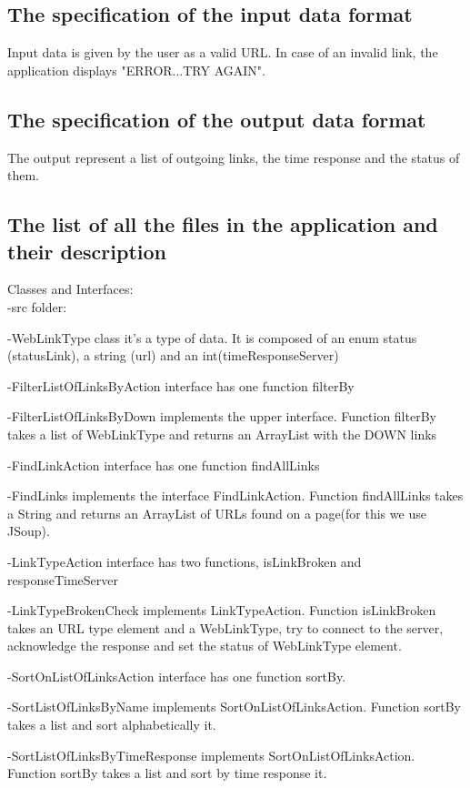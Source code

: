 \documentclass[11pt,leqno]{article}
\begin{document}
\subsection{The specification of the input data format}
Input data is given by the user as a valid URL. In case of an invalid link, the application displays "ERROR...TRY AGAIN".
\vspace{5mm}
\subsection{The specification of the output data format}
The output represent a list of outgoing links, the time response and the status of them.
\vspace{5mm}
\newpage
\subsection{The list of all the files in the application and their description}
Classes and Interfaces:\\
-src folder:\par
-WebLinkType class it's a type of data. It is composed of an enum status (statusLink), a string (url) and an int(timeResponseServer)\par
-FilterListOfLinksByAction interface has one function filterBy\par
-FilterListOfLinksByDown implements the upper interface. Function filterBy takes a list of WebLinkType and returns an ArrayList with the DOWN links\par
-FindLinkAction interface has one function findAllLinks\par
-FindLinks implements the interface FindLinkAction. Function findAllLinks takes a String and returns an ArrayList of URLs found on a page(for this we use JSoup).\par
-LinkTypeAction interface has two functions, isLinkBroken and responseTimeServer\par
-LinkTypeBrokenCheck implements LinkTypeAction. Function isLinkBroken takes an URL type element and a WebLinkType, try to connect to the server, acknowledge the response and set the status of WebLinkType element.\par 
-SortOnListOfLinksAction interface has one function sortBy.\par
-SortListOfLinksByName implements SortOnListOfLinksAction. Function sortBy takes a list and sort alphabetically it.\par
-SortListOfLinksByTimeResponse implements SortOnListOfLinksAction. Function sortBy takes a list and sort by time response it.\\
\end{document}
